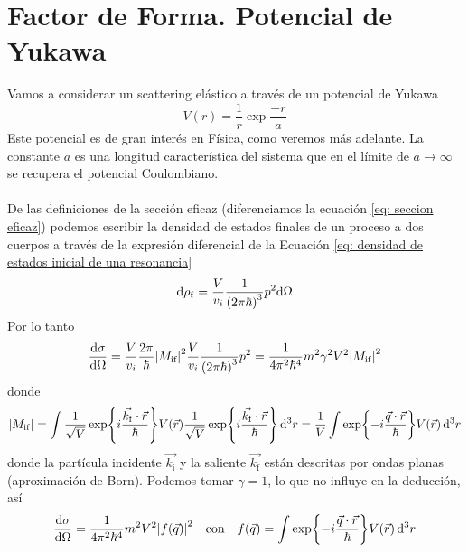 \pagestyle{fancy}
\chapter{Factor de Forma. Potencial de Yukawa}
\label{chap: Apendice C}
Vamos a considerar un scattering elástico a través de un potencial de Yukawa
\begin{equation}
    V(r)=\frac{1}{r}\exp{\dfrac{-r}{a}}
    \label{eq: potencial de yukawa}
\end{equation}
Este potencial es de gran interés en Física, como veremos más adelante. La constante $a$ es una longitud característica del sistema que en el límite de $a\xrightarrow{}\infty$ se recupera el potencial Coulombiano.\\\\
De las definiciones de la sección eficaz (diferenciamos la ecuación \ref{eq: seccion eficaz}) podemos escribir la densidad de estados finales de un proceso a dos cuerpos a través de la expresión diferencial de la Ecuación \ref{eq: densidad de estados inicial de una resonancia} 
\begin{equation}
    \dd \rho_\mathrm{f}=\frac{V}{v_i} \frac{1}{\qty(2\pi\hbar)^3}p^2 \dd \Omega
    \label{eq: diferencial de estados finales a dos cuerpos}
\end{equation}
Por lo tanto 
\begin{equation}
    \dv{\sigma}{\Omega}=\frac{V}{v_i} \frac{2\pi}{\hbar} \abs{M_\text{if}}^2 \frac{V}{v_i} \frac{1}{\qty(2\pi\hbar)^3} p^2=\frac{1}{4\pi^2 \hbar^4} m^2\gamma^2 V^2 \abs{M_\mathrm{if}}^2
\end{equation}
donde $$\abs{M_\mathrm{if}}=\displaystyle \int \frac{1}{\sqrt{V}}\exp{i\frac{\vec{k_\mathrm{f}}\cdot \vec{r}}{\hbar}}V(\vec{r}) \frac{1}{\sqrt{V}}\exp{i\frac{\vec{k_\mathrm{f}}\cdot \vec{r}}{\hbar}} \,\dd^3r=\frac{1}{V} \displaystyle \int \exp{-i\frac{\vec{q}\cdot \vec{r}}{\hbar}}V(\vec{r}) \, \dd^3r $$
donde la partícula incidente $\vec{k_\mathrm{i}}$ y la saliente $\vec{k_\mathrm{f}}$ están descritas por ondas planas (aproximación de Born). Podemos tomar $\gamma=1$, lo que no influye en la deducción, así 
\begin{equation}
    \dv{\sigma}{\Omega}=\frac{1}{4\pi^2 \hbar^4} m^2 V^2 \abs{f(\vec{q})}^2 \quad \text{con} \quad f(\vec{q})= \displaystyle \int \exp{-i\frac{\vec{q}\cdot \vec{r}}{\hbar}}V(\vec{r}) \, \dd^3r
    \label{eq: scattering de dos particulas cargadas con el propagador del potencial}
\end{equation}


